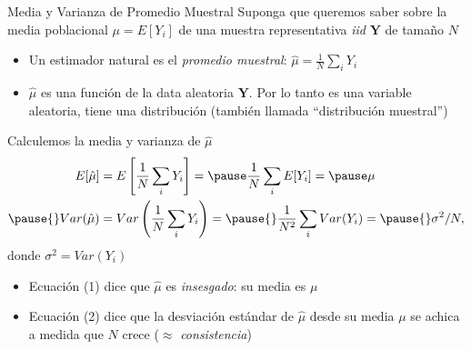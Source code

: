 \documentclass[11pt,handout,aspectratio=169]{beamer}
\begin{document}
\begin{frame}{Media y Varianza de Promedio Muestral}
\vspace{0.1cm}
Suponga que queremos saber sobre la media poblacional $\mu=E[Y_i]$ de una muestra representativa \emph{iid} $\mathbf{Y}$ de tamaño $N$\pause{} 
\pause{}
\begin{itemize}
\item Un estimador natural es el \emph{promedio muestral}: $\hat{\mu}=\frac{1}{N}\sum_i Y_{i}$
\vspace{0.1cm}\pause{}
\item $\hat{\mu}$ es una función de la data aleatoria $\mathbf{Y}$. Por lo tanto es una variable aleatoria, tiene una distribución (también llamada ``distribución muestral'')
\end{itemize}
\vspace{0.2cm}
\pause{}

Calculemos la media y varianza de $\hat{\mu}$
\begin{align*}
E[\hat{\mu}]&=E\left[\frac{1}{N}\sum_i Y_i\right]=\pause\frac{1}{N}\sum_i E[Y_i]=\pause\mu\\\pause{}
Var(\hat{\mu})&=Var\left(\frac{1}{N}\sum_i Y_i\right)=\pause{}\frac{1}{N^2}\sum_iVar(Y_i)=\pause{}\sigma^2/N,
\end{align*}
donde $\sigma^2=Var(Y_i)$ 
\pause{}

\begin{itemize}
\item Ecuación (1) dice que $\hat{\mu}$ es \emph{insesgado}: su media es $\mu$
\vspace{0.1cm}
\pause{}
\item Ecuación (2) dice que la desviación estándar de $\hat{\mu}$ desde su media $\mu$ se achica a medida que $N$ crece ($\approx$ \emph{consistencia})
\end{itemize}

\end{frame}
\end{document}
